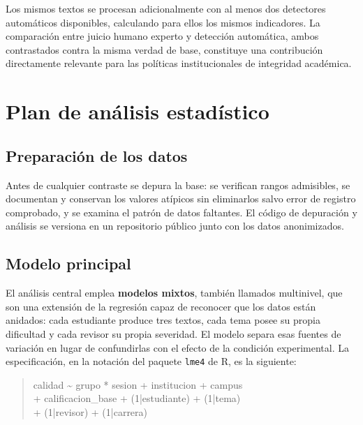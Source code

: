 \documentclass[12pt,a4paper,openany]{report}
\begin{document}
    Los mismos textos se procesan adicionalmente con al menos dos detectores autom\'aticos disponibles, calculando para ellos los mismos indicadores. La comparaci\'on entre juicio humano experto y detecci\'on autom\'atica, ambos contrastados contra la misma verdad de base, constituye una contribuci\'on directamente relevante para las pol\'iticas institucionales de integridad acad\'emica.
    
    \chapter{Plan de an\'alisis estad\'istico}
    \label{cap:analisis}
    
    \section{Preparaci\'on de los datos}
    
    Antes de cualquier contraste se depura la base: se verifican rangos admisibles, se documentan y conservan los valores at\'ipicos sin eliminarlos salvo error de registro comprobado, y se examina el patr\'on de datos faltantes. El c\'odigo de depuraci\'on y an\'alisis se versiona en un repositorio p\'ublico junto con los datos anonimizados.
    
    \section{Modelo principal}
    
    El an\'alisis central emplea \textbf{modelos mixtos}, tambi\'en llamados multinivel, que son una extensi\'on de la regresi\'on capaz de reconocer que los datos est\'an anidados: cada estudiante produce tres textos, cada tema posee su propia dificultad y cada revisor su propia severidad. El modelo separa esas fuentes de variaci\'on en lugar de confundirlas con el efecto de la condici\'on experimental. La especificaci\'on, en la notaci\'on del paquete \texttt{lme4} de R, es la siguiente:
    
    \begin{quote}
        \ttfamily\small
        calidad \textasciitilde{} grupo * sesion + institucion + campus \\
        \hspace*{1.2em} + calificacion\_base + (1|estudiante) + (1|tema) \\
        \hspace*{1.2em} + (1|revisor) + (1|carrera)
    \end{quote}
    
\end{document}
